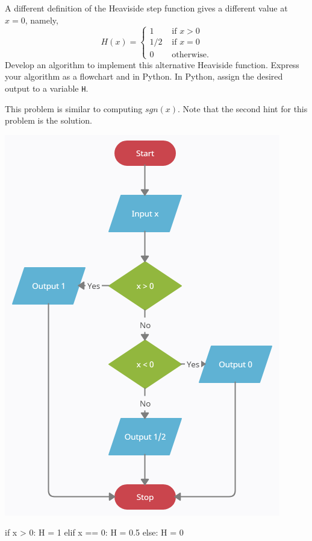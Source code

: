 \documentclass{ximera}
\begin{document}
\begin{question}
A different definition of the Heaviside step function gives a different value at $x=0$, namely,
	$$H(x)=\begin{cases} 1 &\text{ if $x>0$}\\
		1/2 &\text{ if $x=0$}\\
		0 &\text{ otherwise.}
	\end{cases}$$
Develop an algorithm to implement this alternative Heaviside function. Express your algorithm as a flowchart and in Python. In Python, assign the desired output to a variable \verb|H|.
	\begin{hint}
		This problem is similar to computing $sgn(x)$. Note that the second hint for this problem is the solution.
	\end{hint}
	\begin{hint}
	\begin{center}
		\includegraphics{heaviside2.png}
	\end{center}
\begin{sageCell}
if x > 0:
        H = 1
elif x == 0:
        H = 0.5
else:
        H = 0
\end{sageCell}
	\end{hint}
\end{question}
\end{document}

